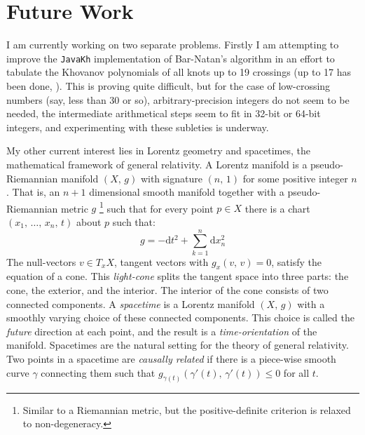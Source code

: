 \documentclass{article}
\theoremstyle{plain}
\begin{document}
    \section{Future Work}
        I am currently working on two separate problems. Firstly I am attempting
        to improve the \texttt{JavaKh} implementation of Bar-Natan's
        algorithm \cite{BarNatan2006FASTKH} in an effort to tabulate the
        Khovanov polynomials of all knots up to 19 crossings (up to 17 has
        been done, \cite{KhovanovData}). This is proving quite difficult, but
        for the case of low-crossing numbers (say, less than 30 or so),
        arbitrary-precision integers do not seem to be needed, the intermediate
        arithmetical steps seem to fit in 32-bit or 64-bit integers, and
        experimenting with these subleties is underway.
        \par\hfill\par
        My other current interest lies in Lorentz geometry and spacetimes,
        the mathematical framework of general relativity. A Lorentz manifold
        is a pseudo-Riemannian manifold $(X,\,g)$ with signature $(n,\,1)$ for
        some positive integer $n$. That is, an $n+1$ dimensional smooth
        manifold together with a pseudo-Riemannian metric $g$%
        \footnote{
            Similar to a Riemannian metric, but the positive-definite
            criterion is relaxed to non-degeneracy.
        }
        such that for every point $p\in{X}$ there is a chart
        $(x_{1},\,\dots,\,x_{n},\,t)$ about $p$ such that:
        \begin{equation}
            g=-\textrm{d}t^{2}+\sum_{k=1}^{n}\textrm{d}x_{n}^{2}
        \end{equation}
        The null-vectors $v\in{T}_{x}X$, tangent vectors with
        $g_{x}(v,\,v)=0$, satisfy the equation of a cone. This
        \textit{light-cone} splits the tangent space into three parts: the
        cone, the exterior, and the interior. The interior of the cone consists
        of two connected components. A \textit{spacetime} is a Lorentz manifold
        $(X,\,g)$ with a smoothly varying choice of these connected
        components. This choice is called the \textit{future} direction at
        each point, and the result is a \textit{time-orientation} of the
        manifold. Spacetimes are the natural setting for the theory of
        general relativity. Two points in a spacetime are
        \textit{causally related} if there is a piece-wise smooth curve
        $\gamma$ connecting them such that
        $g_{\gamma(t)}(\gamma'(t),\,\gamma'(t))\leq{0}$ for all $t$.
\end{document}
